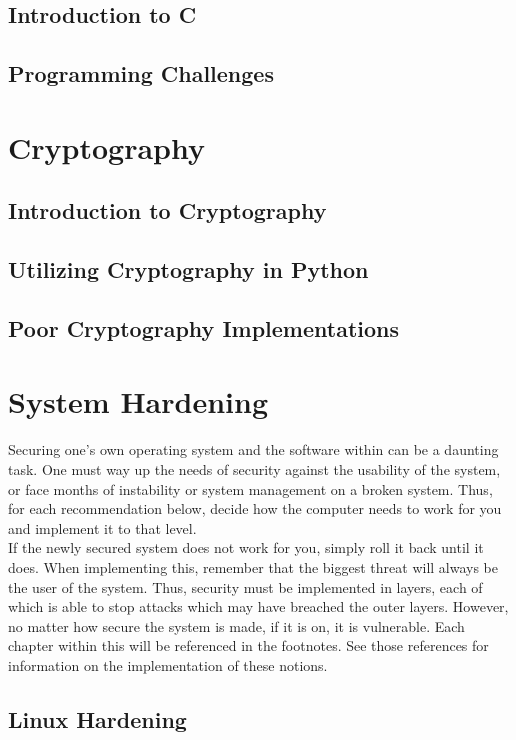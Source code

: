 \documentclass[a4paper,11pt]{report}
\begin{document}
	\section{Introduction to C}
	\section{Programming Challenges}
\chapter{Cryptography}
	\section{Introduction to Cryptography}
	\section{Utilizing Cryptography in Python}
	\section{Poor Cryptography Implementations}
\chapter{System Hardening}
	Securing one's own operating system and the software within can be a daunting task. 
	One must way up the needs of security against the usability of the system, or face months of instability or system management on a broken system. 
	Thus, for each recommendation below, decide how the computer needs to work for you and implement it to that level.\\ 
	If the newly secured system does not work for you, simply roll it back until it does. 
	When implementing this, remember that the biggest threat will always be the user of the system. 
	Thus, security must be implemented in layers, each of which is able to stop attacks which may have breached the outer layers. However, no matter how secure the system is made, if it is on, it is vulnerable. 
	Each chapter within this will be referenced in the footnotes. See those references for information on the implementation of these notions. 
	\section{Linux Hardening}\cite{FedoraSecGuide}
\end{document}
